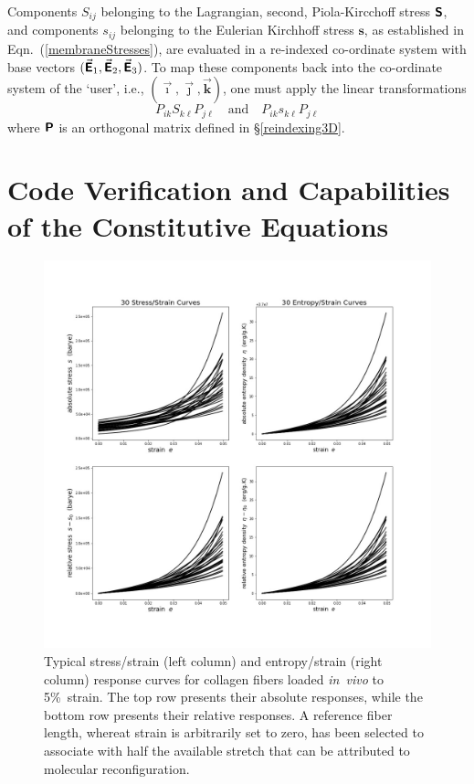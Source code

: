 Components $S_{ij}$ belonging to the Lagrangian, second, Piola-Kircchoff stress $\boldsymbol{\mathsf{S}}$, and components $s_{ij}$ belonging to the Eulerian Kirchhoff stress $\boldsymbol{s}$, as established in Eqn.~(\ref{membraneStresses}), are evaluated in a re-indexed co-ordinate system with base vectors $( \vec{\boldsymbol{\mathsf{E}}}_1 , \vec{\boldsymbol{\mathsf{E}}}_2 , \vec{\boldsymbol{\mathsf{E}}}_3 )$.  To map these components back into the co-ordinate system of the `user', i.e., $( \vec{\boldsymbol{\imath}} , \vec{\boldsymbol{\jmath}} , \vec{\boldsymbol{k}} )$, one must apply the linear transformations
\begin{displaymath}
P_{ik} S_{k\ell} P_{j\ell}
\quad \text{and} \quad
P_{ik} s_{k\ell} P_{j\ell} 
\end{displaymath}
where $\boldsymbol{\mathsf{P}}$ is an orthogonal matrix defined in \S\ref{reindexing3D}.

\section{Code Verification and Capabilities of the Constitutive Equations}
\label{secCE_verifyCode}

\begin{figure}
    \includegraphics[width=\textwidth]{figures/bioFibers5.jpg}
    \caption{Typical stress\slash strain (left column) and entropy\slash strain (right column) response curves for collagen fibers loaded \textit{in~vivo\/} to 5\%\ strain. The top row presents their absolute responses, while the bottom row presents their relative responses.  A reference fiber length, whereat strain is arbitrarily set to zero, has been selected to associate with half the available stretch that can be attributed to molecular reconfiguration.}
    \label{figCollagenFibersInVivo}
\end{figure}

